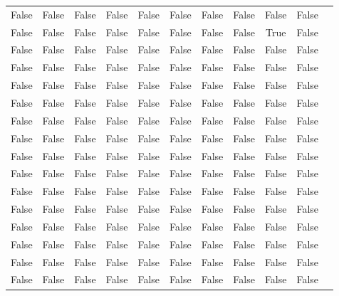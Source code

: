 \documentclass[../EDI_Task3_Karwowski_Kowalewski.tex]{subfiles}
\begin{document}
{{\begin{table}[!htbp]
\begin{tabular}{|c|c|c|c|c|c|c|c|c|c|c|}
                False   &   False   &   False   &   False   &   False   &   False   &   False   &   False   &   False   &   False \\
                False   &   False   &   False   &   False   &   False   &   False   &   False   &   False   &    True   &   False \\
                False   &   False   &   False   &   False   &   False   &   False   &   False   &   False   &   False   &   False \\
                False   &   False   &   False   &   False   &   False   &   False   &   False   &   False   &   False   &   False \\
                False   &   False   &   False   &   False   &   False   &   False   &   False   &   False   &   False   &   False \\
                False   &   False   &   False   &   False   &   False   &   False   &   False   &   False   &   False   &   False \\
                False   &   False   &   False   &   False   &   False   &   False   &   False   &   False   &   False   &   False \\
                False   &   False   &   False   &   False   &   False   &   False   &   False   &   False   &   False   &   False \\
                False   &   False   &   False   &   False   &   False   &   False   &   False   &   False   &   False   &   False \\
                False   &   False   &   False   &   False   &   False   &   False   &   False   &   False   &   False   &   False \\
                False   &   False   &   False   &   False   &   False   &   False   &   False   &   False   &   False   &   False \\
                False   &   False   &   False   &   False   &   False   &   False   &   False   &   False   &   False   &   False \\
                False   &   False   &   False   &   False   &   False   &   False   &   False   &   False   &   False   &   False \\
                False   &   False   &   False   &   False   &   False   &   False   &   False   &   False   &   False   &   False \\
                False   &   False   &   False   &   False   &   False   &   False   &   False   &   False   &   False   &   False \\
                False   &   False   &   False   &   False   &   False   &   False   &   False   &   False   &   False   &   False \\

\end{tabular}
\end{table}}}
\end{document}
